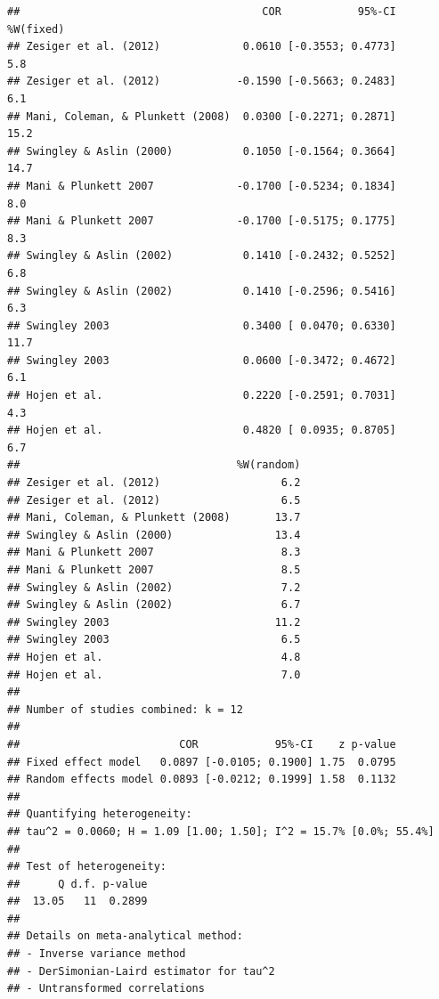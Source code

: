 \documentclass[man]{apa6}
\theoremstyle{definition}
\theoremstyle{definition}
\theoremstyle{definition}
\theoremstyle{remark}
\begin{document}
\begin{verbatim}
##                                      COR            95%-CI %W(fixed)
## Zesiger et al. (2012)             0.0610 [-0.3553; 0.4773]       5.8
## Zesiger et al. (2012)            -0.1590 [-0.5663; 0.2483]       6.1
## Mani, Coleman, & Plunkett (2008)  0.0300 [-0.2271; 0.2871]      15.2
## Swingley & Aslin (2000)           0.1050 [-0.1564; 0.3664]      14.7
## Mani & Plunkett 2007             -0.1700 [-0.5234; 0.1834]       8.0
## Mani & Plunkett 2007             -0.1700 [-0.5175; 0.1775]       8.3
## Swingley & Aslin (2002)           0.1410 [-0.2432; 0.5252]       6.8
## Swingley & Aslin (2002)           0.1410 [-0.2596; 0.5416]       6.3
## Swingley 2003                     0.3400 [ 0.0470; 0.6330]      11.7
## Swingley 2003                     0.0600 [-0.3472; 0.4672]       6.1
## Hojen et al.                      0.2220 [-0.2591; 0.7031]       4.3
## Hojen et al.                      0.4820 [ 0.0935; 0.8705]       6.7
##                                  %W(random)
## Zesiger et al. (2012)                   6.2
## Zesiger et al. (2012)                   6.5
## Mani, Coleman, & Plunkett (2008)       13.7
## Swingley & Aslin (2000)                13.4
## Mani & Plunkett 2007                    8.3
## Mani & Plunkett 2007                    8.5
## Swingley & Aslin (2002)                 7.2
## Swingley & Aslin (2002)                 6.7
## Swingley 2003                          11.2
## Swingley 2003                           6.5
## Hojen et al.                            4.8
## Hojen et al.                            7.0
## 
## Number of studies combined: k = 12
## 
##                         COR            95%-CI    z p-value
## Fixed effect model   0.0897 [-0.0105; 0.1900] 1.75  0.0795
## Random effects model 0.0893 [-0.0212; 0.1999] 1.58  0.1132
## 
## Quantifying heterogeneity:
## tau^2 = 0.0060; H = 1.09 [1.00; 1.50]; I^2 = 15.7% [0.0%; 55.4%]
## 
## Test of heterogeneity:
##      Q d.f. p-value
##  13.05   11  0.2899
## 
## Details on meta-analytical method:
## - Inverse variance method
## - DerSimonian-Laird estimator for tau^2
## - Untransformed correlations
\end{verbatim}
\end{document}
